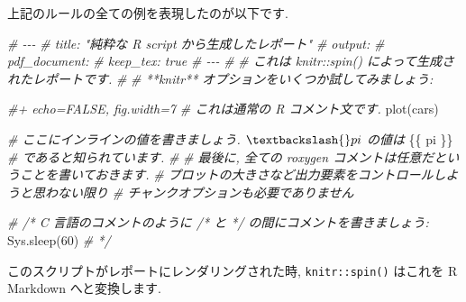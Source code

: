 \documentclass[
  11pt,
  lualatex,ja=standard,jafont=noto]{bxjsreport}
\newenvironment{Shaded}{\begin{snugshade}}{\end{snugshade}}
\newcommand{\CommentTok}[1]{\textcolor[rgb]{0.56,0.35,0.01}{\textit{#1}}}
\newcommand{\DecValTok}[1]{\textcolor[rgb]{0.00,0.00,0.81}{#1}}
\newcommand{\FunctionTok}[1]{\textcolor[rgb]{0.00,0.00,0.00}{#1}}
\newcommand{\NormalTok}[1]{#1}
\begin{document}
上記のルールの全ての例を表現したのが以下です.

\begin{Shaded}
\begin{Highlighting}[]
\CommentTok{\#\textquotesingle{} {-}{-}{-}}
\CommentTok{\#\textquotesingle{} title: "純粋な R script から生成したレポート"}
\CommentTok{\#\textquotesingle{} output:}
\CommentTok{\#\textquotesingle{}   pdf\_document:}
\CommentTok{\#\textquotesingle{}     keep\_tex: true}
\CommentTok{\#\textquotesingle{} {-}{-}{-}}
\CommentTok{\#\textquotesingle{}}
\CommentTok{\#\textquotesingle{} これは \textasciigrave{}knitr::spin()\textasciigrave{} によって生成されたレポートです.}
\CommentTok{\#\textquotesingle{}}
\CommentTok{\#\textquotesingle{} **knitr** オプションをいくつか試してみましょう:}

\CommentTok{\#+ echo=FALSE, fig.width=7}
\CommentTok{\#  これは通常の R コメント文です.}
\FunctionTok{plot}\NormalTok{(cars)}

\CommentTok{\#\textquotesingle{} ここにインラインの値を書きましょう. $\textbackslash{}pi$ の値は}
\NormalTok{\{\{ pi \}\}}
\CommentTok{\#\textquotesingle{} であると知られています.}
\CommentTok{\#\textquotesingle{}}
\CommentTok{\#\textquotesingle{} 最後に, 全ての roxygen コメントは任意だということを書いておきます.}
\CommentTok{\#\textquotesingle{} プロットの大きさなど出力要素をコントロールしようと思わない限り}
\CommentTok{\#\textquotesingle{} チャンクオプションも必要でありません}

\CommentTok{\# /* C 言語のコメントのように /* と */ の間にコメントを書きましょう:}
\FunctionTok{Sys.sleep}\NormalTok{(}\DecValTok{60}\NormalTok{)}
\CommentTok{\# */}
\end{Highlighting}
\end{Shaded}

このスクリプトがレポートにレンダリングされた時, \texttt{knitr::spin()} はこれを R Markdown へと変換します.
\end{document}
